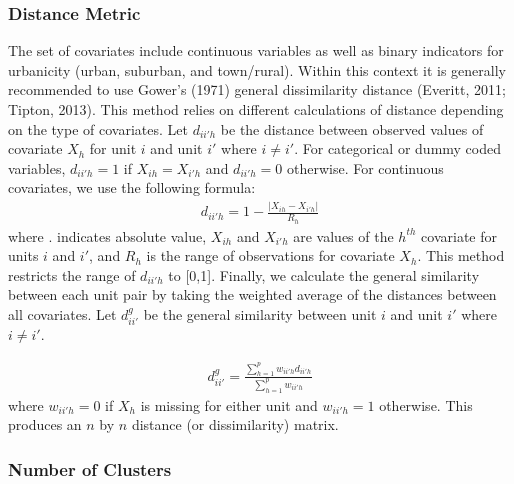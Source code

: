 \documentclass[,man]{apa6}
\theoremstyle{definition}
\theoremstyle{definition}
\theoremstyle{definition}
\theoremstyle{remark}
\begin{document}
\hypertarget{distance-metric}{%
\subsubsection{Distance Metric}\label{distance-metric}}

The set of covariates include continuous variables as well as binary
indicators for urbanicity (urban, suburban, and town/rural). Within this
context it is generally recommended to use Gower's (1971) general
dissimilarity distance (Everitt, 2011; Tipton, 2013). This method relies
on different calculations of distance depending on the type of
covariates. Let \(d_{ii'h}\) be the distance between observed values of
covariate \(X_{h}\) for unit \(i\) and unit \(i'\) where \(i \ne i'\).
For categorical or dummy coded variables, \(d_{ii'h} = 1\) if
\(X_{ih} = X_{i'h}\) and \(d_{ii'h} = 0\) otherwise. For continuous
covariates, we use the following formula: \begin{align}
  d_{ii'h} = 1 - \frac{|X_{ih} - X_{i'h}|}{R_h}
\end{align} where \textbar{}.\textbar{} indicates absolute value,
\(X_{ih}\) and \(X_{i'h}\) are values of the \(h^{th}\) covariate for
units \(i\) and \(i'\), and \(R_h\) is the range of observations for
covariate \(X_h\). This method restricts the range of \(d_{ii'h}\) to
{[}0,1{]}. Finally, we calculate the general similarity between each
unit pair by taking the weighted average of the distances between all
covariates. Let \(d^{g}_{ii'}\) be the general similarity between unit
\(i\) and unit \(i'\) where \(i \ne i'\).

\begin{align}
  d^{g}_{ii'} = \frac{\sum^p_{h = 1}w_{ii'h}d_{ii'h}}{\sum^p_{h = 1}w_{ii'h}}
\end{align} where \(w_{ii'h} = 0\) if \(X_h\) is missing for either unit
and \(w_{ii'h} = 1\) otherwise. This produces an \(n\) by \(n\) distance
(or dissimilarity) matrix.

\hypertarget{number-of-clusters}{%
\subsubsection{Number of Clusters}\label{number-of-clusters}}
\end{document}
